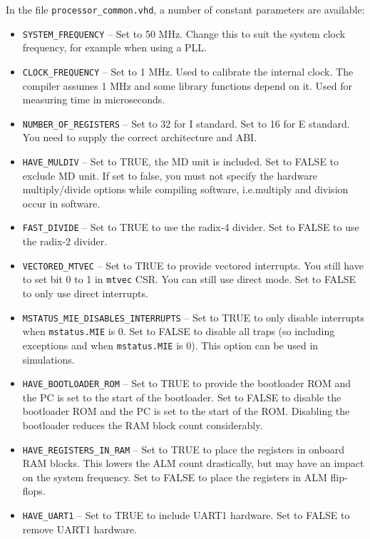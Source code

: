 \documentclass[12pt]{article}
\begin{document}
In the file \lstinline|processor_common.vhd|, a number of constant parameters are available:
\begin{itemize}
\item \lstinline|SYSTEM_FREQUENCY| -- Set to 50 MHz. Change this to suit the system clock frequency, for example when using a PLL.
\item \lstinline|CLOCK_FREQUENCY| -- Set to 1 MHz. Used to calibrate the internal clock. The compiler assumes 1 MHz and some library functions depend on it. Used for measuring time in microseconds.
\item \lstinline|NUMBER_OF_REGISTERS| -- Set to 32 for I standard. Set to 16 for E standard. You need to supply the correct architecture and ABI.
\item \lstinline|HAVE_MULDIV| -- Set to TRUE, the MD unit is included. Set to FALSE to exclude MD unit. If set to false, you must not specify the hardware multiply/divide options while compiling software, i.e.\@ multiply and division occur in software.
\item \lstinline|FAST_DIVIDE| -- Set to TRUE to use the radix-4 divider. Set to FALSE to use the radix-2 divider.
\item \lstinline|VECTORED_MTVEC| -- Set to TRUE to provide vectored interrupts. You still have to set bit 0 to 1 in \lstinline|mtvec| CSR. You can still use direct mode. Set to FALSE to only use direct interrupts.
\item \lstinline|MSTATUS_MIE_DISABLES_INTERRUPTS| -- Set to TRUE to only disable interrupts when \lstinline|mstatus.MIE| is 0. Set to FALSE to disable all traps (so including exceptions and when \lstinline|mstatus.MIE| is 0). This option can be used in simulations.
\item \lstinline|HAVE_BOOTLOADER_ROM| -- Set to TRUE to provide the bootloader ROM and the PC is set to the start of the bootloader. Set to FALSE to disable the bootloader ROM and the PC is set to the start of the ROM. Disabling the bootloader reduces the RAM block count considerably.
\item \lstinline|HAVE_REGISTERS_IN_RAM| -- Set to TRUE to place the registers in onboard RAM blocks. This lowers the ALM count drastically, but may have an impact on the system frequency. Set to FALSE to place the registers in ALM flip-flops.
\item \lstinline|HAVE_UART1| -- Set to TRUE to include UART1 hardware. Set to FALSE to remove UART1 hardware.

\end{itemize}
\end{document}
